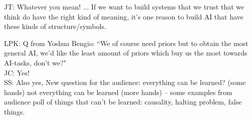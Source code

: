 JT: Whatever you mean! ... If we want to build systems that we trust that we think do have the right kind of meaning, it's one reason to build AI that have these kinds of structure/symbols. \\

\spacerule

LPK: Q from Yoshua Bengio: ``We of course need priors but to obtain the most general AI, we'd like the least amount of priors which buy us the most towards AI-tasks, don't we?" \\

JC: Yes! \\

SS: Also yes, New question for the audience: everything can be learned? (some hands) not everything can be learned (more hands) -- some examples from audience poll of things that can't be learned: causality, halting problem, false things. \\

